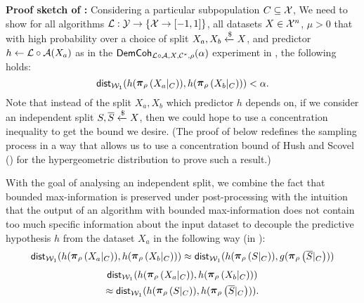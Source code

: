\vspace{-0.5em}
\medskip\noindent\textbf{Proof sketch of :} 
Considering a particular subpopulation $C\subseteq \mathcal{X}$, 
We need to show for all algorithms $\mathcal{L}:\mathcal{Y}\to\{\mathcal{X} \to [-1,1]\}$, all datasets $X\in\mathcal{X}^n$, $\mu > 0$ that with high probability over a choice of split $X_a, X_b \xleftarrow{\$} X$, and predictor $h\leftarrow \mathcal{L}\circ\mathcal{A}(X_a)$ as in the $\mathsf{DemCoh}_{\mathcal{L}\circ\mathcal{A},X,\mathcal{C}^*,\rho}(\alpha)$ experiment in , the following holds:
$$\wdist(h(\restrict{X_a\lvert_C}{\rho}), h(\restrict{X_b\lvert_C}{\rho})) < \alpha.$$
Note that instead of the split $X_a,X_b$ which predictor $h$ depends on, if we consider an independent split $S,\overline{S}\xleftarrow{\$} X$, then we could hope to use a concentration inequality to get the bound we desire. (The proof of  below redefines the sampling process in a way that allows us to use a concentration bound of Hush and Scovel () for the hypergeometric distribution to prove such a result.)

With the goal of analysing an independent split, we combine the fact that bounded max-information is preserved under post-processing with the intuition that the output of an algorithm with bounded max-information does not contain too much specific information about the input dataset to decouple the predictive hypothesis $h$ from the dataset $X_a$ in the following way (in ):
\ifnum{}
\begin{align*}
\wdist(h(\restrict{X_a\lvert_C}{\rho}), h(\restrict{X_b\lvert_C}{\rho})) \approx \wdist(h(\restrict{S\lvert_C}{\rho}), g(\restrict{\overline{S}\lvert_C}{\rho}))
\end{align*}
\else
\begin{multline*}
\wdist(h(\restrict{X_a\lvert_C}{\rho}), h(\restrict{X_b\lvert_C}{\rho})) \\
\approx \wdist(h(\restrict{S\lvert_C}{\rho}), h(\restrict{\overline{S}\lvert_C}{\rho})).
\end{multline*}

\fi

